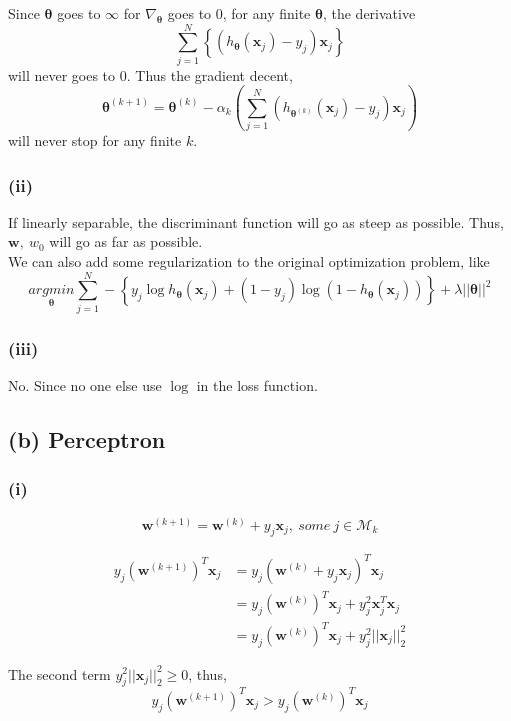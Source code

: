 \documentclass[11pt]{article}
\begin{document}
\noindent Since $\pmb{\theta}$ goes to $\infty$ for $\nabla_{\pmb{\theta}}$ goes to $0$, for any finite $\pmb{\theta}$, the derivative 
$$ \sum_{j=1}^{N}\left\{\left(h_{\pmb{\theta}}(\pmb{x}_j)-y_j\right)\pmb{x}_j \right\}$$
will never goes to $0$. Thus the gradient decent,
$$\pmb{\theta}^{(k+1)}=\pmb{\theta}^{(k)}-\alpha_k\left(\sum_{j=1}^{N}\left(h_{\pmb{\theta}^{(k)}}(\pmb{x}_j)-y_j\right)\pmb{x}_j\right)$$
will never stop for any finite $k$.

\subsubsection*{(ii)}
If linearly separable, the discriminant function will go as steep as possible. Thus, $\pmb{w},\ w_0$ will go as far as possible.\\
We can also add some regularization to the original optimization problem, like
$$\underset{\pmb{\theta}}{argmin} \sum_{j=1}^{N}-\left\{y_j\log h_{\pmb{\theta}}(\pmb{x}_j)+\left(1-y_j\right) \log (1-h_{\pmb{\theta}}(\pmb{x}_j)) \right\}+\lambda||\pmb{\theta}||^2$$

\subsubsection*{(iii)}
No. Since no one else use $\log$ in the loss function.

\subsection*{(b) Perceptron}

\subsubsection*{(i)}

$$\pmb{w}^{(k+1)}=\pmb{w}^{(k)}+y_j\pmb{x}_j,\ some\ j\in \mathcal{M}_k$$

\begin{equation}
\begin{split}
y_j(\pmb{w}^{(k+1)})^T\pmb{x}_j &= y_j(\pmb{w}^{(k)}+y_j\pmb{x}_j)^T\pmb{x}_j\\
&= y_j(\pmb{w}^{(k)})^T\pmb{x}_j+y_j^2\pmb{x}_j^T\pmb{x}_j\\
&= y_j(\pmb{w}^{(k)})^T\pmb{x}_j+y_j^2||\pmb{x}_j||^2_2
\end{split}
\end{equation}

The second term $y_j^2||\pmb{x}_j||^2_2 \ge0$, thus,
$$y_j(\pmb{w}^{(k+1)})^T\pmb{x}_j>y_j(\pmb{w}^{(k)})^T\pmb{x}_j$$
\end{document}
